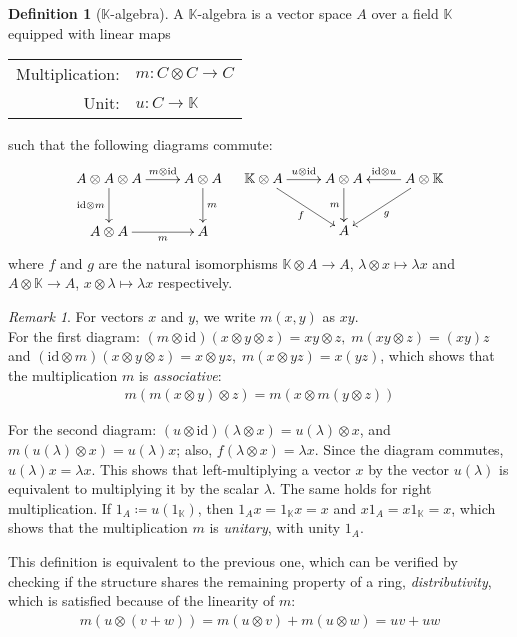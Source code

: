 \documentclass{article}
\theoremstyle{definition}
\newtheorem{Definition}{Definition}
\theoremstyle{remark}
\newtheorem*{Remark*}{Remark}
\theoremstyle{underline}
\theoremstyle{underline}
\newcommand{\id}{\mathrm{id}}
\begin{document}
	\begin{Definition}[$\mathbb K$-algebra]
		A $\mathbb K$-algebra is a vector space $A$ over a field $\mathbb K$ equipped with linear maps 
		\begin{center}
			\begin{tabular}{rl}
		 		Multiplication: & $m \colon C \otimes C \rightarrow C$ \\
		 		Unit: & $ u \colon C \rightarrow \mathbb K$ 
			\end{tabular}
		\end{center} such that the following diagrams commute:
		\begin{align*}
		\xymatrix{
			A \otimes A \otimes A \ar[d]_-{\id \otimes m} \ar[r]^-{m \otimes \id} & A \otimes A \ar[d]^-{m} \\
			A \otimes A \ar[r]_-{m} & A
		} & &
		\xymatrix{
			\mathbb K \otimes A \ar[r]^-{u \otimes \id} \ar[dr]_-{f} & A \otimes A \ar[d]_-{m} & A \otimes \mathbb K \ar[l]_-{\id \otimes u} \ar[dl]^-{g} \\
			& A &	
		}
		\end{align*}
		where $f$ and $g$ are the natural isomorphisms $\mathbb K \otimes A \to A$, $\lambda \otimes x \mapsto \lambda x$ and $A \otimes \mathbb K \to A$, $x \otimes \lambda \mapsto \lambda x$ respectively.
	\end{Definition}
	
	\begin{Remark*} For vectors $x$ and $y$, we write $m(x, y)$ as $xy$.\\
		For the first diagram: $(m \otimes \id)(x \otimes y \otimes z) = xy \otimes z,\; m(xy \otimes z) = (xy)z $ and $(\id \otimes m)(x \otimes y \otimes z) = x \otimes y z,\; m(x \otimes yz) = x(yz)$, which shows that the multiplication $m$ is \emph{associative}:
		\begin{gather*}
		m(m(x \otimes y) \otimes z) = m(x \otimes m(y \otimes z))
		\end{gather*}
		
		For the second diagram: $(u \otimes \id) (\lambda \otimes x) = u(\lambda) \otimes x$, and $m(u(\lambda) \otimes x) = u(\lambda) x$; also, $f(\lambda \otimes x) = \lambda x$. Since the diagram commutes, $u(\lambda) x = \lambda x$. This shows that left-multiplying a vector $x$ by the vector $u(\lambda)$ is equivalent to multiplying it by the scalar $\lambda$. The same holds for right multiplication. If $1_A \coloneqq u(1_{\mathbb K})$, then $1_A x = 1_{\mathbb K} x = x$ and $x 1_A = x 1_{\mathbb K} = x$, which shows that the multiplication $m$ is \emph{unitary}, with unity $1_A$.
		
		This definition is equivalent to the previous one, which can be verified by checking if the structure shares the remaining property of a ring, \emph{distributivity}, which is satisfied because of the linearity of $m$:
		\begin{gather*}
		m(u \otimes (v + w)) = m(u \otimes v) + m(u \otimes w) = uv + uw
		\end{gather*}
	\end{Remark*}
	
\end{document}
